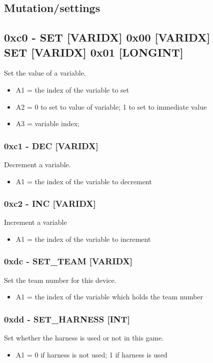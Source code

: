 \documentclass[12pt,a4paper]{scrbook}
\begin{document}
\subsection{Mutation/settings}

\subsection{0xc0 - SET [VARIDX] 0x00 [VARIDX]\\SET [VARIDX] 0x01 [LONGINT]}
Set the value of a variable.
\begin{itemize}
\item A1 = the index of the variable to set
\item A2 = 0 to set to value of variable; 1 to set to immediate value
\item A3 = variable index;
\end{itemize}

\subsubsection{0xc1 - DEC [VARIDX]}
Decrement a variable.
\begin{itemize}
\item A1 = the index of the variable to decrement
\end{itemize}

\subsubsection{0xc2 - INC [VARIDX]}
Increment a variable
\begin{itemize}
\item A1 = the index of the variable to increment
\end{itemize}

\subsubsection{0xdc - SET\_TEAM [VARIDX]}
Set the team number for this device.
\begin{itemize}
\item A1 = the index of the variable which holds the team number
\end{itemize}

\subsubsection{0xdd - SET\_HARNESS [INT]}
Set whether the harness is used or not in this game.
\begin{itemize}
\item A1 = 0 if harness is not used; 1 if harness is used
\end{itemize}
\end{document}
